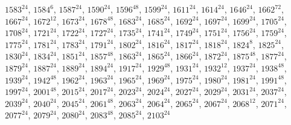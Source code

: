 \begin{itemize}
$1583^{24}$, $1584^{6}$, $1587^{24}$, $1590^{24}$, $1596^{48}$, $1599^{24}$, $1611^{24}$, $1614^{24}$, $1646^{24}$, $1662^{72}$, $1667^{24}$, $1672^{12}$, $1673^{24}$, $1678^{48}$, $1683^{24}$, $1685^{24}$, $1692^{24}$, $1697^{24}$, $1699^{24}$, $1705^{24}$, $1708^{24}$, $1721^{24}$, $1722^{24}$, $1727^{24}$, $1735^{24}$, $1741^{24}$, $1749^{24}$, $1751^{24}$, $1756^{24}$, $1759^{24}$, $1775^{24}$, $1781^{24}$, $1783^{24}$, $1791^{24}$, $1802^{24}$, $1816^{24}$, $1817^{24}$, $1818^{24}$, $1824^{8}$, $1825^{24}$, $1830^{24}$, $1834^{24}$, $1851^{24}$, $1857^{48}$, $1863^{24}$, $1865^{24}$, $1866^{24}$, $1872^{24}$, $1875^{48}$, $1877^{24}$, $1879^{24}$, $1887^{24}$, $1889^{24}$, $1894^{24}$, $1917^{24}$, $1929^{48}$, $1931^{24}$, $1932^{12}$, $1937^{24}$, $1938^{48}$, $1939^{24}$, $1942^{48}$, $1962^{24}$, $1963^{24}$, $1965^{24}$, $1969^{24}$, $1975^{24}$, $1980^{24}$, $1981^{24}$, $1991^{48}$, $1997^{24}$, $2001^{48}$, $2015^{24}$, $2017^{24}$, $2023^{24}$, $2024^{24}$, $2027^{24}$, $2029^{24}$, $2031^{24}$, $2037^{24}$, $2039^{24}$, $2040^{24}$, $2045^{24}$, $2061^{48}$, $2063^{24}$, $2064^{24}$, $2065^{24}$, $2067^{24}$, $2068^{12}$, $2071^{24}$, $2077^{24}$, $2079^{24}$, $2080^{24}$, $2083^{48}$, $2085^{24}$, $2103^{24}$

\end{itemize}
